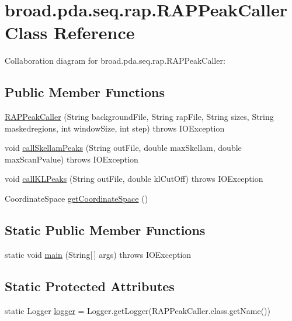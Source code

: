 \hypertarget{classbroad_1_1pda_1_1seq_1_1rap_1_1_r_a_p_peak_caller}{\section{broad.\+pda.\+seq.\+rap.\+R\+A\+P\+Peak\+Caller Class Reference}
\label{classbroad_1_1pda_1_1seq_1_1rap_1_1_r_a_p_peak_caller}
}


Collaboration diagram for broad.\+pda.\+seq.\+rap.\+R\+A\+P\+Peak\+Caller\+:
\subsection*{Public Member Functions}
\begin{DoxyCompactItemize}
\item 
\hyperlink{classbroad_1_1pda_1_1seq_1_1rap_1_1_r_a_p_peak_caller_a2d98e6e4646da4ae9ad14f6fa1284654}{R\+A\+P\+Peak\+Caller} (String background\+File, String rap\+File, String sizes, String maskedregions, int window\+Size, int step)  throws I\+O\+Exception 
\item 
void \hyperlink{classbroad_1_1pda_1_1seq_1_1rap_1_1_r_a_p_peak_caller_ad88d001df75ac488d424b594cb168c7c}{call\+Skellam\+Peaks} (String out\+File, double max\+Skellam, double max\+Scan\+Pvalue)  throws I\+O\+Exception
\item 
void \hyperlink{classbroad_1_1pda_1_1seq_1_1rap_1_1_r_a_p_peak_caller_a4241a787df082c17f3e7a48545c83be9}{call\+K\+L\+Peaks} (String out\+File, double kl\+Cut\+Off)  throws I\+O\+Exception
\item 
Coordinate\+Space \hyperlink{classbroad_1_1pda_1_1seq_1_1rap_1_1_r_a_p_peak_caller_af18e84651f7d4671be2c7e01ebaadd60}{get\+Coordinate\+Space} ()
\end{DoxyCompactItemize}
\subsection*{Static Public Member Functions}
\begin{DoxyCompactItemize}
\item 
static void \hyperlink{classbroad_1_1pda_1_1seq_1_1rap_1_1_r_a_p_peak_caller_ab15edd4dac77fd24e3c0124ee1cd4806}{main} (String\mbox{[}$\,$\mbox{]} args)  throws I\+O\+Exception
\end{DoxyCompactItemize}
\subsection*{Static Protected Attributes}
\begin{DoxyCompactItemize}
\item 
static Logger \hyperlink{classbroad_1_1pda_1_1seq_1_1rap_1_1_r_a_p_peak_caller_a5da587cd17e74c8508f897795a604316}{logger} = Logger.\+get\+Logger(R\+A\+P\+Peak\+Caller.\+class.\+get\+Name())
\end{DoxyCompactItemize}


